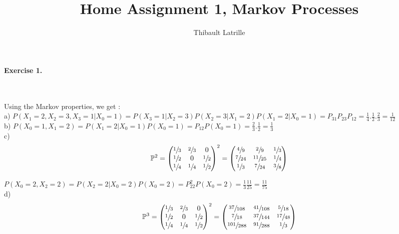 \documentclass{article}
\author{Thibault Latrille}
\title{Home Assignment 1, Markov Processes}
\begin{document}
\maketitle
\paragraph{Exercise 1.}

\

Using the Markov properties, we get :\\


a) $P(X_1=2,X_2=3,X_3=1|X_0=1)=P(X_3=1|X_2=3)P(X_2=3|X_1=2)P(X_1=2|X_0=1)=P_{31}P_{23}P_{12}=\frac{1}{4}.\frac{1}{2}.\frac{2}{3}=\frac{1}{12}$ \\

b) $P(X_0=1,X_1=2)=P(X_1=2|X_0=1)P(X_0=1)=P_{12}P(X_0=1)=\frac{2}{3}.\frac{1}{2}=\frac{1}{3}$ \\

c) 
\begin{align*}
\mathbb{P}^2=
\begin{pmatrix}
\sfrac{1}{3} & \sfrac{2}{3} & 0  \\
\sfrac{1}{2} & 0 & \sfrac{1}{2} \\
\sfrac{1}{4} & \sfrac{1}{4} & \sfrac{1}{2}   \\
\end{pmatrix}^2
=
\begin{pmatrix}
\sfrac{4}{9} & \sfrac{2}{9} & \sfrac{1}{3}  \\
\sfrac{7}{24} & \sfrac{11}{25} & \sfrac{1}{4} \\
\sfrac{1}{3} & \sfrac{7}{24} & \sfrac{3}{8}   \\
\end{pmatrix}
\end{align*}

$P(X_0=2,X_2=2)=P(X_2=2|X_0=2)P(X_0=2)=P_{22}^2 P(X_0=2)=\frac{1}{3}\frac{11}{25}=\frac{11}{75}$ \\

d) 
\begin{align*}
\mathbb{P}^3=
\begin{pmatrix}
\sfrac{1}{3} & \sfrac{2}{3} & 0  \\
\sfrac{1}{2} & 0 & \sfrac{1}{2} \\
\sfrac{1}{4} & \sfrac{1}{4} & \sfrac{1}{2}   \\
\end{pmatrix}^2
=
\begin{pmatrix}
\sfrac{37}{108} & \sfrac{41}{108} & \sfrac{5}{18}  \\
\sfrac{7}{18} & \sfrac{37}{144} & \sfrac{17}{48} \\
\sfrac{101}{288} & \sfrac{91}{288} & \sfrac{1}{3}   \\
\end{pmatrix}
\end{align*}
\end{document}
